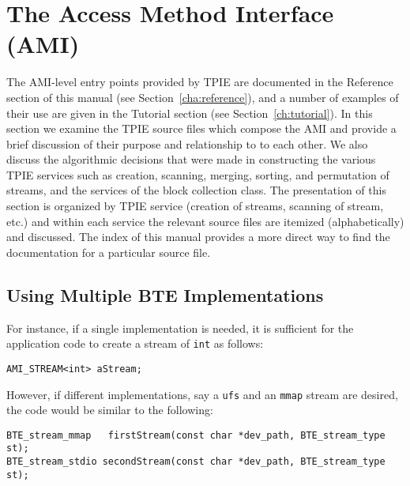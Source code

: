 


\section{The Access Method Interface (AMI)}

The AMI-level entry points provided by
TPIE are documented in the Reference section of this manual (see
Section~\ref{cha:reference}), and a number of examples of their use
are given in the Tutorial section (see Section~\ref{ch:tutorial}).  In
this section we examine the TPIE source files which compose the AMI
and provide a brief discussion of their purpose and relationship to to
each other. We also discuss the algorithmic decisions that were made
in constructing the various TPIE services such as creation, scanning,
merging, sorting, and permutation of streams, and the services of the
block collection class. The presentation of this section is organized
by TPIE service (creation of streams, scanning of stream, etc.) and
within each service the relevant source files are itemized
(alphabetically) and discussed. The index of this manual provides a
more direct way to find the documentation for a particular source
file.

\subsection{Using Multiple BTE Implementations}

For instance, if a single implementation
is needed, it is sufficient for the application code to create a
stream of \lstinline|int| as follows:

\begin{lstlisting}
AMI_STREAM<int> aStream;
\end{lstlisting}
However, if different implementations, say a \lstinline|ufs| and an
\lstinline|mmap| stream are desired, the code would be similar to the
following:
\begin{lstlisting}
BTE_stream_mmap   firstStream(const char *dev_path, BTE_stream_type st);
BTE_stream_stdio secondStream(const char *dev_path, BTE_stream_type st);
\end{lstlisting}

